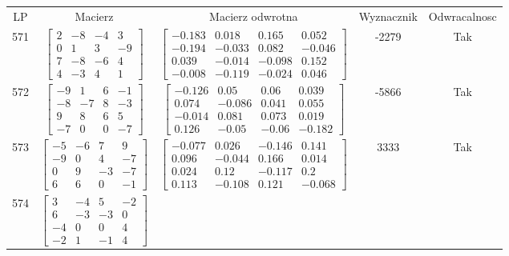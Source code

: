 \documentclass[a4paper,12pt]{article}
\begin{document}
\bgroup {} \vspace{0.2in} \begin{tabular}{c c c c c}
LP & Macierz & Macierz odwrotna & Wyznacznik & Odwracalnosc\\
571
&
$\begin{bmatrix} 2 & -8 & -4 & 3 \\ 0 & 1 & 3 & -9 \\ 7 & -8 & -6 & 4 \\ 4 & -3 & 4 & 1 \end{bmatrix}$
&
$\begin{bmatrix} -0.183 & 0.018 & 0.165 & 0.052 \\ -0.194 & -0.033 & 0.082 & -0.046 \\ 0.039 & -0.014 & -0.098 & 0.152 \\ -0.008 & -0.119 & -0.024 & 0.046 \end{bmatrix}$
&
-2279
&
Tak
\\
572
&
$\begin{bmatrix} -9 & 1 & 6 & -1 \\ -8 & -7 & 8 & -3 \\ 9 & 8 & 6 & 5 \\ -7 & 0 & 0 & -7 \end{bmatrix}$
&
$\begin{bmatrix} -0.126 & 0.05 & 0.06 & 0.039 \\ 0.074 & -0.086 & 0.041 & 0.055 \\ -0.014 & 0.081 & 0.073 & 0.019 \\ 0.126 & -0.05 & -0.06 & -0.182 \end{bmatrix}$
&
-5866
&
Tak
\\
573
&
$\begin{bmatrix} -5 & -6 & 7 & 9 \\ -9 & 0 & 4 & -7 \\ 0 & 9 & -3 & -7 \\ 6 & 6 & 0 & -1 \end{bmatrix}$
&
$\begin{bmatrix} -0.077 & 0.026 & -0.146 & 0.141 \\ 0.096 & -0.044 & 0.166 & 0.014 \\ 0.024 & 0.12 & -0.117 & 0.2 \\ 0.113 & -0.108 & 0.121 & -0.068 \end{bmatrix}$
&
3333
&
Tak
\\
574
&
$\begin{bmatrix} 3 & -4 & 5 & -2 \\ 6 & -3 & -3 & 0 \\ -4 & 0 & 0 & 4 \\ -2 & 1 & -1 & 4 \end{bmatrix}$

\end{tabular}
\end{document}
